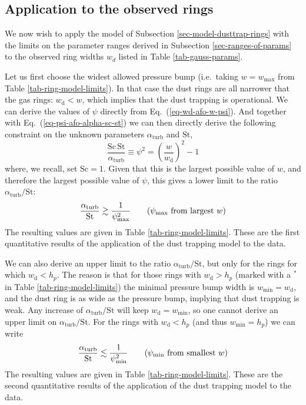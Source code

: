 \documentclass{aa}
\begin{document}
\subsection{Application to the observed rings}
\label{sec-application-to-rings}
%
We now wish to apply the model of Subsection \ref{sec-model-dusttrap-rings}
with the limits on the parameter ranges derived in Subsection
\ref{sec-ranges-of-params} to the observed ring widths $w_d$ listed in
Table \ref{tab-gauss-params}. 

Let us first choose the widest allowed pressure bump (i.e.\ taking
$w=w_{\mathrm{max}}$ from Table \ref{tab-ring-model-limits}). In that
case the dust rings are all narrower that the gas rings: $w_{\mathrm{d}}<w$,
which implies that the dust trapping is operational. We can derive the
values of $\psi$ directly from Eq.~(\ref{eq-wd-afo-w-psi}). And together
with Eq.~(\ref{eq-psi-afo-alpha-sc-st}) we can then directly derive the
following constraint on the unknown parameters $\alpha_{\mathrm{turb}}$
and $\mathrm{St}$, 
\begin{equation}
\frac{\mathrm{Sc}\,\mathrm{St}}{\alpha_{\mathrm{turb}}} \equiv \psi^2 = \left(\frac{w}{w_{\mathrm{d}}}\right)^2-1
\end{equation}
where, we recall, set $\mathrm{Sc}=1$. Given that this is the largest
possible value of $w$, and therefore the largest possible value
of $\psi$, this gives a lower limit to the ratio $\alpha_{\mathrm{turb}}/\mathrm{St}$:
\begin{equation}
\frac{\alpha_{\mathrm{turb}}}{\mathrm{St}} \gtrsim \frac{1}{\psi^2_{\mathrm{max}}} \qquad\hbox{($\psi_{\mathrm{max}}$ from largest $w$)}
\end{equation}
The resulting values are given in Table \ref{tab-ring-model-limits}.  These are
the first quantitative results of the application of the dust trapping model to
the data.

We can also derive an upper limit to the ratio
$\alpha_{\mathrm{turb}}/\mathrm{St}$, but only for the rings for which
$w_{\mathrm{d}}<h_p$. The reason is that for those rings with
$w_{\mathrm{d}}>h_p$ (marked with a $^{*}$ in Table \ref{tab-ring-model-limits})
the minimal pressure bump width is $w_{\mathrm{min}}=w_{\mathrm{d}}$, and the
dust ring is as wide as the pressure bump, implying that dust trapping is weak.
Any increase of $\alpha_{\mathrm{turb}}/\mathrm{St}$ will keep
$w_{\mathrm{d}}=w_{\mathrm{min}}$, so one cannot derive an upper limit on
$\alpha_{\mathrm{turb}}/\mathrm{St}$. For the rings with $w_{\mathrm{d}}<h_p$
(and thus $w_{\mathrm{min}}=h_p$) we can write
\begin{equation}
\frac{\alpha_{\mathrm{turb}}}{\mathrm{St}} \lesssim \frac{1}{\psi^2_{\mathrm{min}}} \qquad\hbox{($\psi_{\mathrm{min}}$ from smallest $w$)}
\end{equation}
The resulting values are given in Table \ref{tab-ring-model-limits}.  These are
the second quantitative results of the application of the dust trapping model to
the data.
\end{document}
